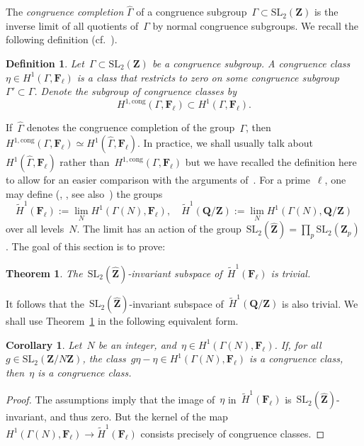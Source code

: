 \documentclass[10pt]{amsart}
\def\Hcong{H^{1,\mathrm{cong}}}
\def\Gammah{\widehat{\Gamma}}
\def\Zhat{\widehat{\Z}}
\def\Htw{\widetilde{H}}
\def\SSS{\S}
\def\F{\mathbf{F}}
\def\Z{\mathbf{Z}}
\def\Q{\mathbf{Q}}
\newtheorem{theorem}[subsubsection]{Theorem}
\newtheorem{df}[subsubsection]{Definition}
\newtheorem{corr}[subsubsection]{Corollary}
\theoremstyle{remark}
\numberwithin{equation}{subsection}
\def\SL{\mathrm{SL}}
\begin{document}
The \emph{congruence completion} $\Gammah$ of a congruence subgroup~$\Gamma \subset \SL_2(\Z)$ is the inverse limit of all quotients of~$\Gamma$
by normal congruence subgroups.
We recall the following definition (cf.~\cite[\SSS~3.7]{CalegariVenkatesh}).
\begin{df} \label{conghom} Let~$\Gamma \subset \SL_2(\Z)$ be a congruence subgroup.
A \emph{congruence class}~$\eta \in H^1(\Gamma,\F_{\ell})$ is a class
that restricts to zero on some congruence subgroup~$\Gamma' \subset \Gamma$.
Denote the subgroup of congruence classes by
$$\Hcong(\Gamma,\F_{\ell}) \subset H^1(\Gamma,\F_{\ell}).$$
 \end{df}
If~$\Gammah$ denotes the congruence completion of the group~$\Gamma$,
then~$\Hcong(\Gamma,\F_{\ell}) \simeq H^1(\Gammah,\F_{\ell})$.
In practice, we shall usually talk about~$H^1(\Gammah,\F_{\ell})$ rather than~$\Hcong(\Gamma,\F_{\ell})$
but we have recalled the definition here to allow for an easier comparison with the arguments of~\cite{CalegariVenkatesh}.
For a prime~$\ell$, one may define (\cite[\SSS~2]{CEgrowth}, \cite[\SSS~1]{MR3466858}, see also~\cite{survey}) the groups
$$\Htw^1(\F_{\ell}) := \lim_{N} H^1(\Gamma(N),\F_{\ell}),
\quad \Htw^1(\Q/\Z) := \lim_{N} H^1(\Gamma(N),\Q/\Z)$$
over all levels~$N$.  The limit has an action of the group~$\SL_2(\Zhat) = \prod_{p} \SL_2(\Z_p)$.
The goal of this section is to prove:

\begin{theorem} \label{noinvariants} The~$\SL_2(\Zhat)$-invariant subspace of~$\Htw^1(\F_{\ell})$ is trivial.
\end{theorem}

It follows that the~$\SL_2(\Zhat)$-invariant subspace of~$\Htw^1(\Q/\Z)$ is also trivial.
We shall use Theorem~\ref{noinvariants} in the following equivalent form.

\begin{corr} \label{new}
Let~$N$ be an integer, and~$\eta \in H^1(\Gamma(N),\F_{\ell})$.
If, for all~$g \in \SL_2(\Z/N\Z)$, the class~$g \eta - \eta
\in H^1(\Gamma(N),\F_{\ell})$ is a congruence class, then~$\eta$ is   a congruence class.
\end{corr}

\begin{proof} The assumptions imply that the image of~$\eta$ in~$\Htw^1(\F_{\ell})$
is~$\SL_2(\Zhat)$-invariant, and thus zero. But the kernel of the 
map~$H^1(\Gamma(N),\F_{\ell}) \rightarrow \Htw^1(\F_{\ell})$ consists
precisely of congruence classes.
\end{proof}
\end{document}
